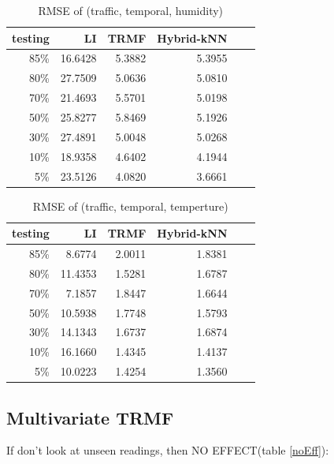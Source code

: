 \begin{table} [htbp]
\centering
\caption{RMSE of (traffic, temporal, humidity)}
\label{table:traffic_temporal_hum}
\begin{tabular}{ r | r r r r r}
	testing	&LI	&TRMF	&Hybrid-kNN \\ \hline
	85\%	&16.6428	&5.3882	&5.3955\\ 
	80\%	&27.7509	&5.0636	&5.0810\\
	70\%	&21.4693	&5.5701	&5.0198\\
	50\%	&25.8277	&5.8469	&5.1926\\
	30\%	&27.4891	&5.0048	&5.0268\\
	10\%	&18.9358	&4.6402	&4.1944\\
	 5\%	&23.5126	&4.0820	&3.6661\\
\end{tabular}
\end{table}


\begin{table} [htbp]
\centering
\caption{RMSE of (traffic, temporal, temperture)}
\label{table:traffic_temporal_tem}
\begin{tabular}{ r | r r r r r}
	testing	&LI	&TRMF	&Hybrid-kNN \\ \hline
	85\%	& 8.6774	&2.0011	&1.8381\\ 
	80\%	&11.4353	&1.5281	&1.6787\\
	70\%	& 7.1857	&1.8447	&1.6644\\
	50\%	&10.5938	&1.7748	&1.5793\\
	30\%	&14.1343	&1.6737	&1.6874\\
	10\%	&16.1660	&1.4345	&1.4137\\
	 5\%	&10.0223	&1.4254	&1.3560\\
\end{tabular}
\end{table}

\subsection{Multivariate TRMF}
If don't look at unseen readings, then NO EFFECT(table \ref{noEff}):

